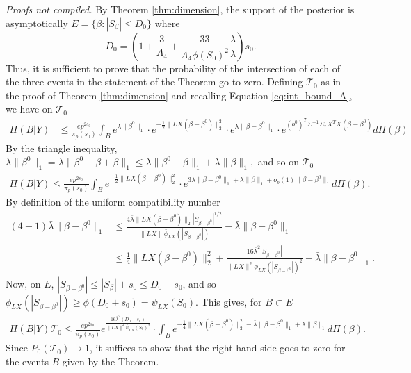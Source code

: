 \documentclass[11pt]{article}
\renewenvironment{proof}[1]{\par\noindent{\bf #1 \ }}{\hfill\BlackBox\\[2mm]}
\renewenvironment{proof}[1]{\textit{Proofs not compiled.}}{}
\newcommand{\bezero}{\beta^0}
\newcommand{\postCov}{\Sigma_*}
\begin{document}
\begin{proof}{Proof of Theorem \ref{thm:recovery}.}
By Theorem \ref{thm:dimension}, the support of the posterior is asymptotically
$
E = \{\beta : |S_\beta| \leq D_0 \}
$
where
$$
D_0 = \left(1 + \frac{3}{A_4} + \frac{33}{A_4 \phi(S_0)^2}\frac{\lambda}{\bar{\lambda}}\right)s_0.
$$
Thus, it is sufficient to prove that the probability of the intersection of each of the three events in the statement of the Theorem go to zero.
Defining $\mathcal{T}_0$ as in the proof of Theorem \ref{thm:dimension} and recalling Equation \eqref{eq:int_bound_A}, we have on $\mathcal{T}_0$
\begin{align*}
	\Pi(B | Y) &\leq \frac{e p^{2s_0}}{\pi_p(s_0)} \int_B e^{\lambda\|\beta^0\|_1} \cdot e^{-\frac{1}{2}\|LX(\beta - \bezero)\|_2^2} 
\cdot  e^{\bar{\lambda}\|\beta - \bezero\|_1} \cdot e^{(b^0)^T\Sigma^{-1}\postCov  X^TX (\beta - \bezero)} d\Pi(\beta) 
\end{align*}
By the triangle inequality, 
$
\lambda\|\bezero\|_1 = \lambda\|\bezero - \beta + \beta\|_1 \leq \lambda\|\bezero - \beta\|_1 + \lambda\|\beta\|_1,
$
and so on $\mathcal{T}_0$
\begin{align*}
		\Pi(B | Y) \leq 	\frac{e p^{2s_0}}{\pi_p(s_0)} \int_B  e^{-\frac{1}{2}\|LX(\beta - \bezero)\|_2^2} 
\cdot  e^{3\bar{\lambda}\|\beta - \bezero\|_1 + \lambda\|\beta\|_1 + o_p(1)\|\beta - \bezero\|_1} d\Pi(\beta).
\end{align*}
By definition of the uniform compatibility number
\begin{align}
(4 - 1)\bar{\lambda}\|\beta - \bezero\|_1 &\leq \frac{4\bar{\lambda} \|LX(\beta - \bezero)\|_2|S_{\beta-\bezero}|^{1/2}}{\|LX\| \bar{\phi}_{LX}(|S_{\beta - \bezero}|)} - \bar{\lambda}\|\beta - \bezero\|_1 \nonumber\\
&\leq \frac{1}{4}\|LX(\beta - \bezero)\|_2^2 + \frac{16\bar{\lambda}^2 |S_{\beta - \bezero}|}{\|LX\|^2 \bar{\phi}_{LX}(|S_{\beta - \bezero}|)^2} - \bar{\lambda}\|\beta - \bezero\|_1. \label{eq:lambda_beta_beta_0}
\end{align}
Now, on $E$, $|S_{\beta - \bezero}| \leq |S_\beta| + s_0 \leq D_0 + s_0$, and so $\bar{\phi}_{LX}(|S_{\beta - \bezero}|) \geq \bar{\phi}(D_0 + s_0) = \bar{\psi}_{LX}(S_0)$. This gives, for $B \subset E$
\begin{align*}
	\Pi(B | Y)\mathcal{T}_0 \leq \frac{e p^{2s_0}}{\pi_p(s_0)}e^{\frac{16\bar{\lambda}^2(D_0 + s_0)}{\|LX\|^2\bar{\psi}_{LX}(S_0)^2}} \cdot \int_B e^{-\frac{1}{4} \|LX(\beta - \bezero)\|_2^2 -\bar{\lambda}\|\beta - \bezero\|_1 + \lambda\|\beta\|_1}d\Pi(\beta). 
\end{align*}
Since $P_0(\mathcal{T}_0) \rightarrow 1$, it suffices to show that the right hand side goes to zero for the events $B$ given by the Theorem.


\end{proof}
\end{document}
